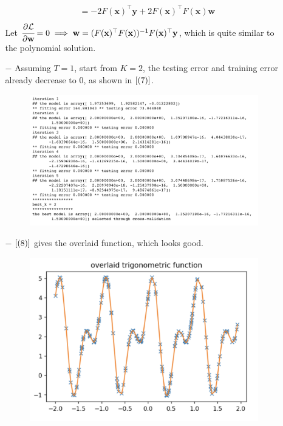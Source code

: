 \documentclass[11pt]{article}
\begin{document}
\begin{itemize}
\begin{itemize}
\begin{equation}
\begin{aligned}
& = -2F(\textbf{x})^{\top} \textbf{y} + 2 F(\textbf{x})^{\top}F(\textbf{x})\textbf{w} \nonumber \\
\end{aligned}
\end{equation}
Let $\cfrac{\partial \mathcal{L}}{\partial {\textbf{w}}} = 0 \implies \textbf{w} = (F(\textbf{x})^{\top}F(\textbf{x}))^{-1}F(\textbf{x})^{\top} \textbf{y}$, which is quite similar to the polynomial solution.
\item[$-$] Assuming $T=1$, start from $K = 2$, the testing error and training error already decrease to 0, as shown in $\ref{(7)}$.
 \begin{figure}[htbp]
\centering
\includegraphics[width = .85\textwidth]{7.png}
\caption{}
\label{(7)}
\end{figure}
\item[$-$] $\ref{(8)}$ gives the overlaid function, which looks good.
\begin{figure}[htbp]
\centering
\includegraphics[width = .6\textwidth]{8.png}
\caption{}
\label{(8)}
\end{figure}
\end{itemize}
\end{itemize}
\end{document}
